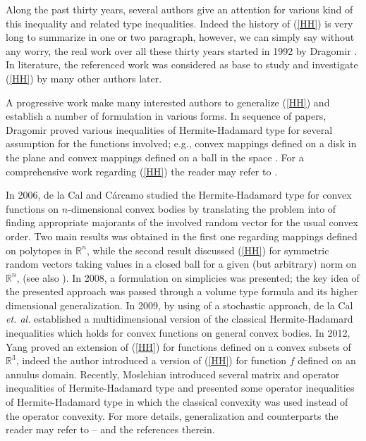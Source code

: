 \documentclass{amsart}
\theoremstyle{plain}
\numberwithin{equation}{section}
\begin{document}
Along the past thirty years, several authors give an attention for
various kind of this inequality and related type inequalities.
Indeed the history of (\ref{HH}) is very long to summarize in one
or two paragraph, however, we can simply say without any worry,
the real work over all these thirty years started in 1992 by
Dragomir \cite{Dragomir1}. In literature, the referenced work
\cite{Dragomir1} was considered as base to study and investigate
(\ref{HH}) by many other authors later.

A progressive work make many interested authors to generalize
(\ref{HH}) and establish a number of formulation in various forms.
In sequence of papers, Dragomir proved various inequalities of
Hermite-Hadamard type for several assumption for the functions
involved; e.g., convex mappings defined on a disk in the plane and
convex mappings defined on a ball in the space . For a
comprehensive work regarding (\ref{HH}) the reader may refer to
\cite{Dragomir1}.

In 2006, de la Cal and C\'{a}rcamo \cite{Cal} studied the
Hermite-Hadamard type for convex functions on $n$-dimensional
convex bodies by translating the problem into of finding
appropriate majorants of the involved random vector for the usual
convex order. Two main results was obtained in \cite{Cal} the
first one regarding mappings defined on polytopes in
$\mathbb{R}^n$, while the second result discussed (\ref{HH}) for
symmetric random vectors taking values in a closed ball for a
given (but arbitrary) norm on $\mathbb{R}^n$, (see also
\cite{Cal1}). In 2008,  a formulation on simplicies was presented;
the key idea of the presented approach was passed through a volume
type formula and its higher dimensional generalization. In 2009,
by using of a stochastic approach, de la Cal \emph{et. al.}
established a multidimensional version of the classical
Hermite-Hadamard inequalities which holds for convex functions on
general convex bodies. In 2012, Yang \cite{Yang} proved an
extension of (\ref{HH}) for functions defined on a convex subsets
of $\mathbb{R}^3$, indeed the author introduced a version of
(\ref{HH}) for function $f$ defined on an annulus domain.
Recently, Moslehian \cite{Moslehian} introduced several matrix and
operator inequalities of Hermite-Hadamard type and presented some
operator inequalities of Hermite-Hadamard type in which the
classical convexity was used instead of the operator convexity.
For more details, generalization and counterparts the reader may
refer to
\cite{alomari}--\cite{Yang} and the references therein.\\
\end{document}
